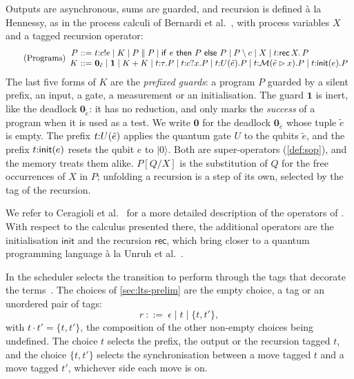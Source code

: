 Outputs are asynchronous, sums are guarded, and recursion is defined \`a la
Hennessy, as in the process calculi of Bernardi et al.~\cite{BFL26}, with process variables
$X$ and a tagged recursion operator:
\begin{equation}\label{eq:programs}\tag{Programs}
\begin{array}{r@{\ ::=\ }l}
P & \tagged{t}{c!e} \mid K \mid P \parallel P \mid \ite{e}{P}{P} \mid P \setminus c
    \mid X \mid \tagged{t}{\rec{X}{P}}\\
K & \mathbf{0}_{\tilde e} \mid \mathbf{1} \mid K + K \mid
    \tagged{t}{\tau}.P \mid \tagged{t}{c?x}.P \mid
    \tagged{t}{U(\tilde e)}.P \mid \tagged{t}{\M(\tilde e \rhd x)}.P
    \mid \tagged{t}{\mathsf{init}(e)}.P
\end{array}
\end{equation}
The last five forms of $K$ are the \emph{prefixed guards}: a program $P$
guarded by a silent prefix, an input, a gate, a measurement or an
initialisation.
The guard $\mathbf{1}$ is inert, like the deadlock $\mathbf{0}_{\tilde e}$: it
has no reduction, and only marks the \emph{success} of a program when it is used
as a test. We write $\mathbf{0}$ for the deadlock $\mathbf{0}_{\tilde e}$ whose
tuple $\tilde e$ is empty. The prefix $t{:}U(\tilde e)$ applies the quantum gate $U$ to the
qubits $\tilde e$, and the prefix $t{:}\mathsf{init}(e)$ resets
the qubit $e$ to $|0\rangle$. Both are super-operators
(\cref{def:sop}), and the memory treats them alike.
$P[Q/X]$ is the substitution of $Q$ for the free occurrences of $X$ in $P$;
unfolding a recursion is a step of its own, selected by the tag of the recursion.

We refer to Ceragioli et al.~\cite{Ceragioli27} for a more detailed description of the
operators of \lqCCS. With respect to the calculus presented there, the
additional operators are the initialisation $\mathsf{init}$ and the
recursion $\mathsf{rec}$, which bring \lqCCS closer to a quantum programming
language \`a la Unruh et al.~\cite{UVY26}.

In \lqCCS the scheduler selects the transition to perform through the tags
that decorate the terms~\cite{Ceragioli25}. The choices of
\cref{sec:lts-prelim} are the empty choice, a tag or an unordered pair of
tags:
\[
r \ ::=\ \epsilon \mid t \mid \{t,t'\} ,
\]
with $t \cdot t' = \{t,t'\}$, the composition of the other non-empty choices
being undefined. The choice $t$ selects the prefix, the output or the
recursion tagged $t$, and the choice $\{t,t'\}$ selects the synchronisation
between a move tagged $t$ and a move tagged $t'$, whichever side each move is
on.

